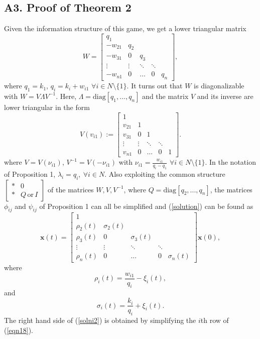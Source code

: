 \documentclass[10pt, conference, compsocconf]{IEEEtran}
\begin{document}
\subsection*{A3. Proof of Theorem 2}
Given the  information structure of this game, we get a lower triangular matrix
\[ W = \left[ \begin{array}{ccccc}
q_1 &  & & & \\
-w_{21} & q_2 &  && \\
-w_{31} & 0 & q_{3} && \\
\vdots& \vdots & \ddots &\ddots &\\
-w_{n1} & 0 & \dots& 0 & q_n
\end{array} \right], \]
where $q_1 = k_1$, $q_i = k_i + w_{i1}$ $\forall i \in N \setminus \{1\}$. It turns out that $W$ is diagonalizable with  $W = V \Lambda V^{-1}$. Here, $\Lambda = \mbox{diag}[q_1, ... , q_n]$ and the matrix $V$ and its inverse are lower triangular in the form 
\[ V(v_{i1}) := \left[ \begin{array}{ccccc}
1 &  & & &\\
v_{21} & 1  & & & \\
v_{31} & 0 & 1 &  \\
\vdots &\vdots & \ddots&\ddots& \\
v_{n1} & 0 & \dots & 0 & 1
\end{array} \right].
\]
where $V=V(\nu_{i1})$, $V^{-1} = V(-\nu_{i1})$ with $\nu_{i1} = \frac{w_{i1}}{q_i - q_1}$ $\forall i \in N\setminus \{1\}$. In the notation of Proposition 1, $\lambda_{i}=q_i, \ \forall i\in N$. Also exploiting the common structure
$
\left[ \begin{array}{cc}*&0\\ *&Q\,\mbox{or}\,I\end{array}\right]
$
of the matrices $W, V, V^{-1}$, where $Q = \mbox{diag}[q_2,...,q_n]$, the matrices $\phi_{ij}$ and $\psi_{ij}$ of Proposition 1 can all be simplified and (\ref{solution}) can be found as
\begin{equation} \label{eqn18}
\mathbf{x}(t) = \left[ \begin{array}{ccccc}
1 & & & & \\
\rho_2(t) & \sigma_2(t) & & & \\
\rho_3(t) & 0 & \sigma_3(t) & & \\
\vdots & \vdots & \ddots & \ddots & \\
\rho_n(t) & 0 & \dots & 0 & \sigma_n(t)
\end{array} \right] \mathbf{x}(0),
\end{equation}
where
\[ \rho_i(t) = \frac{w_{i1}}{q_i}  - \xi_i(t),
\]
and
\[ \sigma_i(t) = \frac{k_i}{q_i}  + \xi_i(t).
\]
The right hand side of (\ref{solni2}) is obtained by simplifying the $i$th row of (\ref{eqn18}).
\end{document}
